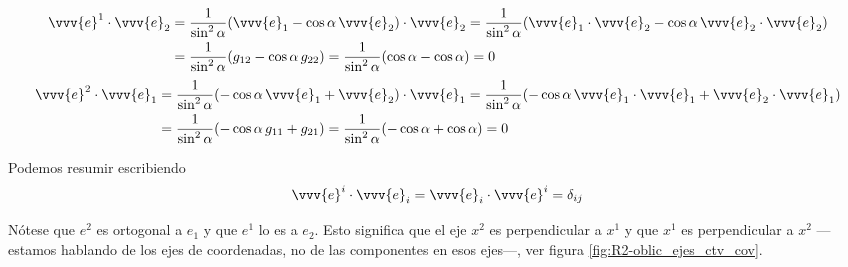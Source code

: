\begin{align*}
  \vvv{e}^1\cdot\vvv{e}_2
  &=
    \dfrac{1}{\sin^2\alpha}
    (\vvv{e}_1-\cos\alpha\,\vvv{e}_2)\cdot\vvv{e}_2
    = \dfrac{1}{\sin^2\alpha}
    (\vvv{e}_1\cdot\vvv{e}_2 - \cos\alpha\,\vvv{e}_2\cdot\vvv{e}_2)\\
  &=
    \dfrac{1}{\sin^2\alpha} (g_{12} - \cos\alpha\,g_{22})    
    = \dfrac{1}{\sin^2\alpha} (\cos\alpha - \cos\alpha)    
    = 0
\end{align*}
\begin{align*}
  \vvv{e}^2\cdot\vvv{e}_1
  &=
    \dfrac{1}{\sin^2\alpha}
    (-\cos\alpha\,\vvv{e}_1+\vvv{e}_2)\cdot\vvv{e}_1
    = \dfrac{1}{\sin^2\alpha}
    (-\cos\alpha\,\vvv{e}_1\cdot\vvv{e}_1 + \vvv{e}_2\cdot\vvv{e}_1)\\
  &=
    \dfrac{1}{\sin^2\alpha} (-\cos\alpha\,g_{11} + g_{21})
    = \dfrac{1}{\sin^2\alpha} (-\cos\alpha + \cos\alpha)    
    = 0
\end{align*}

Podemos resumir escribiendo
\begin{equation}
  \vvv{e}^i\cdot\vvv{e}_i
  = \vvv{e}_i\cdot\vvv{e}^i
  = \delta_{ij}
\end{equation}

Nótese que $e^2$ es ortogonal a $e_1$ y que $e^1$ lo es a $e_2$.
Esto significa que el eje $x^2$ es perpendicular a $x^1$ y que $x^1$ es perpendicular
a $x^2$ ---estamos hablando de los ejes de coordenadas, no de las componentes en esos
ejes---, ver figura \ref{fig:R2-oblic_ejes_ctv_cov}.

